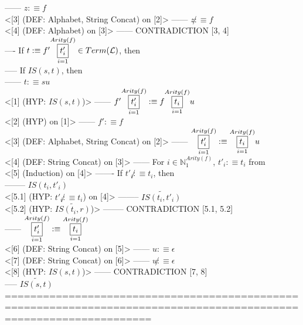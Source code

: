 \documentclass{book}
\newcommand{\is}{:\equiv}
\newcommand{\pnot}[1]{\widetilde{#1}}
\newcommand{\inot}{\not}
\newcommand{\vdc}[3]{\underset{#2}{\overset{#3}{\fbox{$#1$}}}}
\begin{document}
						------ $z \is f$ \\ <[3] (DEF: Alphabet, String Concat) on [2]>
						------ $z \inot \is f$ \\ <[4] (DEF: Alphabet) on [3]>
						------ CONTRADICTION [3, 4] \\
				---- If $t \is f' \vdc{t'_i}{i=1}{Arity(f)} \in Term(\mathcal{L})$, then \\
					----- If $IS(s, t)$, then \\
						------ $t \is s u$ \\ <[1] (HYP: $IS(s, t)$)>
						------ $f' \vdc{t'_i}{i=1}{Arity(f)} \is f \vdc{t_i}{i=1}{Arity(f)} u$ \\ <[2] (HYP) on [1]>
						------ $f' \is f$ \\ <[3] (DEF: Alphabet, String Concat) on [2]>
						------ $\vdc{t'_i}{i=1}{Arity(f)} \is \vdc{t_i}{i=1}{Arity(f)} u$ \\ <[4] (DEF: String Concat) on [3]>
						------ For $i \in \mathbb{N}_1^{Arity(f)}$, $t'_i \is t_i$ from \\ <[5] (Induction) on [4]>
							------- If $t'_i \inot \is t_i$, then \\
								-------- $IS(t_i, t'_i)$ \\ <[5.1] (HYP: $t'_i \inot \is t_i$) on [4]> 
								-------- $\pnot{IS(t_i, t'_i)}$ \\ <[5.2] (HYP: $\pnot{IS(t_i, r)}$)>
								-------- CONTRADICTION [5.1, 5.2] \\
						------ $\vdc{t'_i}{i=1}{Arity(f)} \is \vdc{t_i}{i=1}{Arity(f)}$ \\ <[6] (DEF: String Concat) on [5]>
						------ $u \is \epsilon$ \\ <[7] (DEF: String Concat) on [6]>
						------ $u \inot \is \epsilon$ \\ <[8] (HYP: $IS(s, t)$)>
						------ CONTRADICTION [7, 8] \\
					----- $\pnot{IS(s, t)}$ \\
	===================================================================================================================
\end{document}
